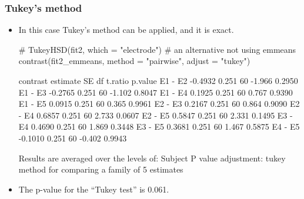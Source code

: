 \documentclass[a4paper]{article}\usepackage[]{graphicx}\usepackage[]{xcolor}
\begin{document}
\subsubsection{Tukey's method}
\begin{itemize}
	\item In this case Tukey's method can be applied, and it is exact.
\begin{Schunk}
\begin{Sinput}
# TukeyHSD(fit2, which = "electrode") # an alternative not using emmeans
contrast(fit2_emmeans, method = "pairwise", adjust = "tukey")
\end{Sinput}
\begin{Soutput}
 contrast estimate    SE df t.ratio p.value
 E1 - E2   -0.4932 0.251 60  -1.966  0.2950
 E1 - E3   -0.2765 0.251 60  -1.102  0.8047
 E1 - E4    0.1925 0.251 60   0.767  0.9390
 E1 - E5    0.0915 0.251 60   0.365  0.9961
 E2 - E3    0.2167 0.251 60   0.864  0.9090
 E2 - E4    0.6857 0.251 60   2.733  0.0607
 E2 - E5    0.5847 0.251 60   2.331  0.1495
 E3 - E4    0.4690 0.251 60   1.869  0.3448
 E3 - E5    0.3681 0.251 60   1.467  0.5875
 E4 - E5   -0.1010 0.251 60  -0.402  0.9943

Results are averaged over the levels of: Subject 
P value adjustment: tukey method for comparing a family of 5 estimates 
\end{Soutput}
\end{Schunk}
	\item The p-value for the ``Tukey test'' is 0.061.
\end{itemize}
\end{document}
